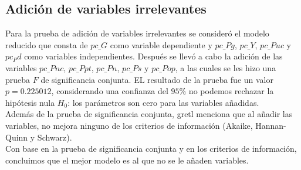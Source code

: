 \documentclass[12pt]{article}
\begin{document}
\subsection*{Adición de variables irrelevantes}
Para la prueba de adición de variables irrelevantes se consideró el modelo
reducido que consta de $pc\_G$ como variable dependiente y $pc\_Pg$, $pc\_Y$,
$pc\_Puc$ y $pc_Pd$ como variables independientes. Después se llevó a cabo
la adición de las variables $pc\_Pnc$, $pc\_Ppt$, $pc\_Pn$, $pc\_Ps$ y $pc\_Pop$,
a las cuales se les hizo una prueba $F$ de significancia conjunta. EL resultado
de la prueba fue un valor $p=0.225012$, considerando una confianza del $95\%$
no podemos rechazar la hipótesis nula $H_0$: los parámetros son cero para las
variables añadidas.\\
Además de la prueba de significancia conjunta, gretl menciona que al añadir
las variables, no mejora ninguno de los criterios de información
(Akaike, Hannan-Quinn y Schwarz).\\
Con base en la prueba de significancia conjunta y en los criterios de información,
concluimos que el mejor modelo es al que no se le añaden variables.

\end{document}
